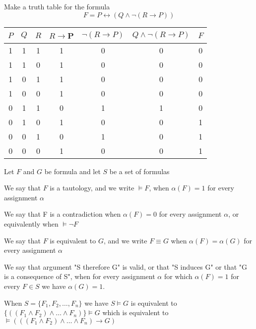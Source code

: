 \begin{exmp}
Make a truth table for the formula $$F = P \leftrightarrow (Q\wedge \neg (R\to P))$$

\begin{center}
\begin{tabular}{c|c|c|c|c|c|c}
     $P$ & $Q$ & $R$ & $R\to $P & $\neg (R\to P)$ & $Q\wedge \neg (R\to P)$ & $F$ \\ \hline
     1 & 1 & 1 & 1 & 0 & 0 & 0\\ \hline
     1 & 1 & 0 & 1 & 0 & 0 & 0 \\ \hline
     1 & 0 & 1 & 1 & 0 & 0 & 0  \\ \hline
     1 & 0 & 0 & 1 & 0 & 0 & 0  \\ \hline
     0 & 1 & 1 & 0 & 1 & 1 & 0 \\ \hline
     0 & 1 & 0 & 1 & 0 & 0 & 1 \\ \hline
     0 & 0 & 1 & 0 & 1 & 0 & 1\\ \hline
     0 & 0 & 0 & 1 & 0 & 0 & 1\\
\end{tabular}
\end{center}
\end{exmp}

Let $F$ and $G$ be formula and let $S$ be a set of formulas 
\begin{defn}
We say that $F$ is a tautology, and we write $\vDash F$, when $\alpha (F) =1$ for every assignment $\alpha$



We say that F is a contradiction when $\alpha (F) = 0$ for every assignment $\alpha$, or equivalently when $\vDash \neg F$

We say that $F$ is equivalent to $G$, and we write $F\equiv G$ when $\alpha (F) = \alpha (G)$ for every assignment $\alpha$

We say that argument "S therefore G" is valid, or that "S induces G" or that "G is a consequence of S", when for every assignment $\alpha$ for which $\alpha (F) = 1$ for every $F\in S$ we have $\alpha (G) = 1$. 

When $S = \{F_1, F_2,\dots ,F_n\}$ we have $S\vDash G$ is equivalent to $\{((F_1\wedge F_2)\wedge \dots \wedge F_n)\} \vDash G$ which is equivalent to $\vDash (((F_1\wedge F_2)\wedge \dots \wedge F_n)\to G)$
\end{defn}


